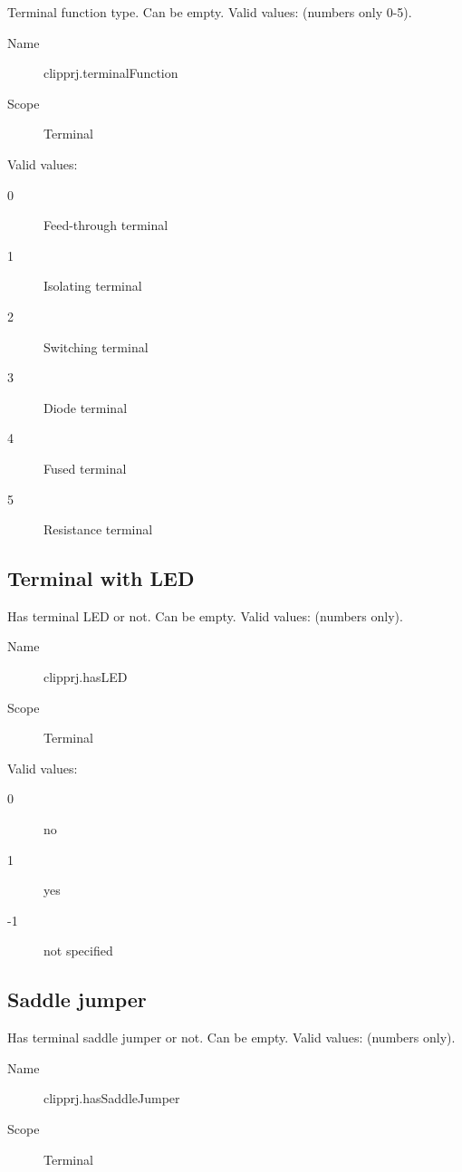 \documentclass[%
	a4paper,
	oneside,
	listof=numbered,
	parskip=half,
	headsepline=true,
	footsepline=true,
	]{scrbook}
\begin{document}
Terminal function type. Can be empty. Valid values: (numbers only 0-5).

\begin{description}
	\item[Name] clipprj.terminalFunction
	\item[Scope] Terminal
\end{description}

Valid values:

\begin{description}
	\item[0] Feed-through terminal
	\item[1] Isolating terminal
	\item[2] Switching terminal
	\item[3] Diode terminal
	\item[4] Fused terminal
	\item[5] Resistance terminal
\end{description}

\subsection{Terminal with LED}

Has terminal LED or not. Can be empty. Valid values: (numbers only).\\

\begin{description}
	\item[Name] clipprj.hasLED
	\item[Scope] Terminal
\end{description}

Valid values:

\begin{description}
	\item[0] no
	\item[1] yes
	\item[-1] not specified
\end{description}

\subsection{Saddle jumper}

Has terminal saddle jumper or not. Can be empty. Valid values: (numbers only).

\begin{description}
	\item[Name] clipprj.hasSaddleJumper
	\item[Scope] Terminal
\end{description}
\end{document}
